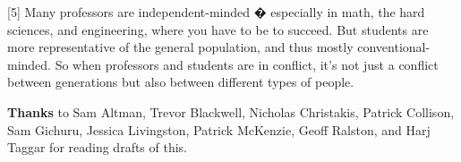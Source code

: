 [5] Many professors are independent-minded � especially in
                  math, the hard sciences, and engineering, where you have to be
                  to succeed. But students are more representative of the
                  general population, and thus mostly conventional-minded. So
                  when professors and students are in conflict, it's not just a
                  conflict between generations but also between different types
                  of people.



\textbf{Thanks} to Sam Altman,
                  Trevor Blackwell, Nicholas Christakis, Patrick Collison, Sam
                  Gichuru, Jessica Livingston, Patrick McKenzie, Geoff Ralston,
                  and Harj Taggar for reading drafts of this.


              
            
          
